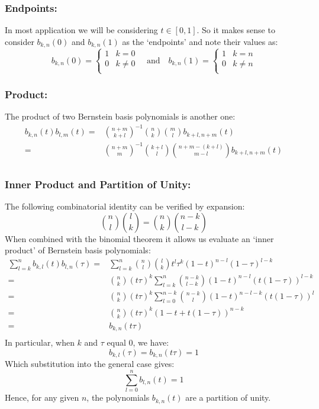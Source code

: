 \subsubsection{Endpoints:}
In most application we will be considering $t\in[0,1]$.
So it makes sense to consider $b_{k,n}(0)$ and $b_{k,n}(1)$ as the `endpoints' and note  their values as:
\[b_{k,n}(0) = \begin{cases}1& k=0\\0&k\neq0\\\end{cases}\quad\text{and}\quad b_{k,n}(1) = \begin{cases}1& k= n\\0&k\neq n\\\end{cases}\]

\subsubsection{Product:}
The product of two Bernstein basis polynomials is another one:
\[\begin{aligned}
	b_{k,n}(t)b_{l,m}(t) =& \binom{n+m}{k+l}^{-1}\binom{n}{k}\binom{m}{l}b_{k+l,n+m}(t)\\
	=&\binom{n+m}{m}^{-1}\binom{k+l}{l}\binom{n+m-(k+l)}{m-l}b_{k+l,n+m}(t)\\
\end{aligned}\]

\subsubsection{Inner Product and Partition of Unity:}
The following combinatorial identity can be verified by expansion:
\[\binom{n}{l}\binom{l}{k} = \binom{n}{k}\binom{n-k}{l-k}\]
When combined with the binomial theorem it allows us evaluate an `inner product' of Bernstein basis polynomials:
\[\begin{aligned}
	\sum_{l=k}^nb_{k,l}(t)b_{l,n}(\tau) =& \sum_{l=k}^n\binom{n}{l}\binom{l}{k}t^l\tau^k(1-t)^{n-l}(1-\tau)^{l-k}\\
	=& \binom{n}{k}(t\tau)^k\sum_{l=k}^n\binom{n-k}{l-k}(1-t)^{n-l}(t(1-\tau))^{l-k}\\
	=& \binom{n}{k}(t\tau)^k\sum_{l=0}^{n-k}\binom{n-k}{l}(1-t)^{n-l-k}(t(1-\tau))^{l}\\
	=& \binom{n}{k}(t\tau)^k(1-t+t(1-\tau))^{n-k}\\
	=& b_{k,n}(t\tau)\\
\end{aligned}\]
In particular,
when $k$ and $\tau$ equal $0$, we have:
\[b_{k,l}(\tau) = b_{k,n}(t\tau) = 1\]
Which substitution into the general case gives:
\[\sum_{l=0}^nb_{l,n}(t) = 1\]
Hence,
for any given $n$,
the polynomials $b_{k,n}(t)$ are a partition of unity.

